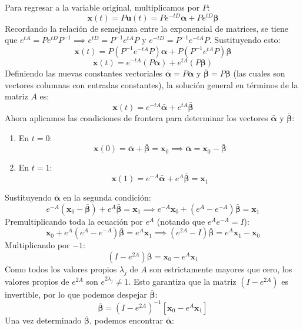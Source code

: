\documentclass[12pt,letterpaper]{article}
\begin{document}
Para regresar a la variable original, multiplicamos por $P$:
\[
  \mathbf{x}(t) = P \mathbf{u}(t) = P e^{-tD} \boldsymbol{\alpha} + P e^{tD} \boldsymbol{\beta}
\]
Recordando la relación de semejanza entre la exponencial de matrices, se tiene que $e^{tA} = P e^{tD} P^{-1} \implies e^{tD} = P^{-1} e^{tA} P$ y $e^{-tD} = P^{-1} e^{-tA} P$. Sustituyendo esto:
\[
  \mathbf{x}(t) = P (P^{-1} e^{-tA} P) \boldsymbol{\alpha} + P (P^{-1} e^{tA} P) \boldsymbol{\beta}
\]
\[
  \mathbf{x}(t) = e^{-tA} (P \boldsymbol{\alpha}) + e^{tA} (P \boldsymbol{\beta})
\]
Definiendo las nuevas constantes vectoriales $\boldsymbol{\bar{\alpha}} = P \boldsymbol{\alpha}$ y $\boldsymbol{\bar{\beta}} = P \boldsymbol{\beta}$ (las cuales son vectores columnas con entradas constantes), la solución general en términos de la matriz $A$ es:
\[
  \mathbf{x}(t) = e^{-tA} \boldsymbol{\bar{\alpha}} + e^{tA} \boldsymbol{\bar{\beta}}
\]
Ahora aplicamos las condiciones de frontera para determinar los vectores $\boldsymbol{\bar{\alpha}}$ y $\boldsymbol{\bar{\beta}}$:
\begin{enumerate}
  \item En $t = 0$:
  \[
    \mathbf{x}(0) = \boldsymbol{\bar{\alpha}} + \boldsymbol{\bar{\beta}} = \mathbf{x}_0 \implies \boldsymbol{\bar{\alpha}} = \mathbf{x}_0 - \boldsymbol{\bar{\beta}}
  \]
  \item En $t = 1$:
  \[
    \mathbf{x}(1) = e^{-A} \boldsymbol{\bar{\alpha}} + e^A \boldsymbol{\bar{\beta}} = \mathbf{x}_1
  \]
\end{enumerate}
Sustituyendo $\boldsymbol{\bar{\alpha}}$ en la segunda condición:
\[
  e^{-A} (\mathbf{x}_0 - \boldsymbol{\bar{\beta}}) + e^A \boldsymbol{\bar{\beta}} = \mathbf{x}_1 \implies e^{-A} \mathbf{x}_0 + (e^A - e^{-A}) \boldsymbol{\bar{\beta}} = \mathbf{x}_1
\]
Premultiplicando toda la ecuación por $e^A$ (notando que $e^A e^{-A} = I$):
\[
  \mathbf{x}_0 + e^A(e^A - e^{-A}) \boldsymbol{\bar{\beta}} = e^A \mathbf{x}_1 \implies (e^{2A} - I) \boldsymbol{\bar{\beta}} = e^A \mathbf{x}_1 - \mathbf{x}_0
\]
Multiplicando por $-1$:
\[
  (I - e^{2A}) \boldsymbol{\bar{\beta}} = \mathbf{x}_0 - e^A \mathbf{x}_1
\]
Como todos los valores propios $\lambda_j$ de $A$ son estrictamente mayores que cero, los valores propios de $e^{2A}$ son $e^{2\lambda_j} \neq 1$. Esto garantiza que la matriz $(I - e^{2A})$ es invertible, por lo que podemos despejar $\boldsymbol{\bar{\beta}}$:
\[
  \boldsymbol{\bar{\beta}} = (I - e^{2A})^{-1} [ \mathbf{x}_0 - e^A \mathbf{x}_1 ]
\]
Una vez determinado $\boldsymbol{\bar{\beta}}$, podemos encontrar $\boldsymbol{\bar{\alpha}}$:
\end{document}
